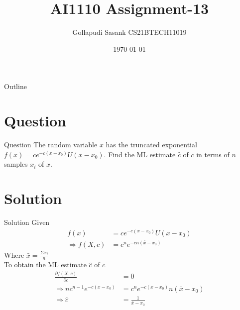 \documentclass{beamer}
\title{AI1110 Assignment-13}
\author{Gollapudi Sasank CS21BTECH11019}
\date{\today}
\begin{document}
\begin{frame}
    \titlepage 
\end{frame}

\logo{}


\begin{frame}{Outline}
    \tableofcontents
\end{frame}


\section{Question}
\begin{frame}{Question}
The random variable $x$ has the truncated exponential $f(x) = ce^{-c(x-x_0)}U(x-x_0)$. Find the ML estimate $\hat{c}$ of $c$ in terms of $n$ samples $x_i$ of $x$.
\end{frame}

\section{Solution}
\begin{frame}{Solution}
Given 
\begin{align}
f(x) &= ce^{-c(x-x_0)}U(x-x_0) \\
\Rightarrow f(X,c) &= c^ne^{-cn(\bar{x}-x_0)} 
\end{align}
Where $\bar{x} = \frac{\Sigma x_i}{n}$ \\
To obtain the ML estimate $\hat{c}$ of $c$ 
\begin{align}
\frac{\partial{f(X,c)}}{\partial{c}} &= 0 \\
\Rightarrow nc^{n-1}e^{-c(x-x_0)}&= c^ne^{-c(x-x_0)}n(\bar{x}-x_0) \\
\Rightarrow \hat{c} &= \frac{1}{\bar{x} - x_0}
\end{align}
\end{frame}
\end{document}

